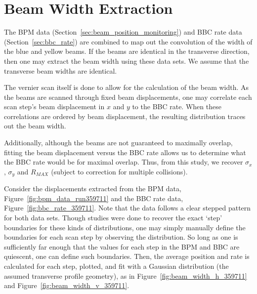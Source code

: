 \clearpage
\section{Beam Width Extraction}
\label{sec:beam_width}

The BPM data (Section~\ref{sec:beam_position_monitoring}) and BBC rate data
(Section~\ref{sec:bbc_rate}) are combined to map out the convolution of the
width of the blue and yellow beams. If the beams are identical in the transverse
direction, then one may extract the beam width using these data sets. We assume
that the transverse beam widths are identical.

The vernier scan itself is done to allow for the calculation of the beam width.
As the beams are scanned through fixed beam displacements, one may correlate
each scan step's beam displacement in $x$ and $y$ to the BBC rate. When these
correlations are ordered by beam displacement, the resulting distribution traces
out the beam width. 

Additionally, although the beams are not guaranteed to maximally overlap,
fitting the beam displacement versus the BBC rate allows us to determine what
the BBC rate would be for maximal overlap. Thus, from this study, we recover
$\sigma_{x}$, $\sigma_{y}$ and $R_{MAX}$ (subject to correction for multiple
collisions).

Consider the displacements extracted from the BPM data,
Figure~\ref{fig:bpm_data_run359711} and the BBC rate data,
Figure~\ref{fig:bbc_rate_359711}. Note that the data follows a clear stepped
pattern for both data sets. Though studies were done to recover the exact
`step' boundaries for these kinds of distributions, one may simply manually
define the boundaries for each scan step by observing the distribution. So long
as one is sufficiently far enough that the values for each step in the BPM and
BBC are quiescent, one can define such boundaries. Then, the average position
and rate is calculated for each step, plotted, and fit with a Gaussian
distribution (the assumed transverse profile geometry), as in
Figure~\ref{fig:beam_width_h_359711} and Figure~\ref{fig:beam_width_v_359711}.


